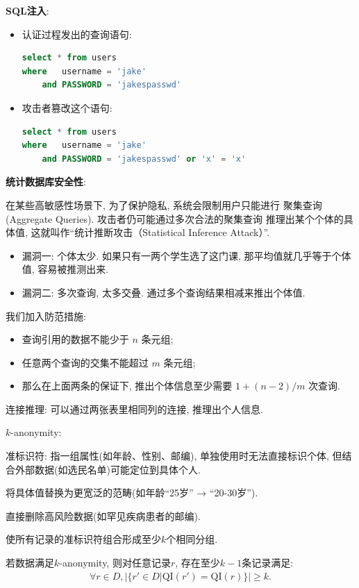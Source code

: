 \textbf{SQL注入}:
\begin{itemize}
    \item 认证过程发出的查询语句:
\begin{lstlisting}[language=SQL]
select * from users
where   username = 'jake'
    and PASSWORD = 'jakespasswd'
\end{lstlisting}
    \item 攻击者篡改这个语句:
\begin{lstlisting}[language=SQL]
select * from users
where   username = 'jake'
    and PASSWORD = 'jakespasswd' or 'x' = 'x'
\end{lstlisting}
\end{itemize}

\textbf{统计数据库安全性}:

在某些高敏感性场景下, 为了保护隐私, 系统会限制用户只能进行 聚集查询(Aggregate Queries).
攻击者仍可能通过多次合法的聚集查询 推理出某个个体的具体值, 这就叫作“统计推断攻击（Statistical Inference Attack）”.
\begin{itemize}
    \item 漏洞一: 个体太少. 如果只有一两个学生选了这门课, 那平均值就几乎等于个体值, 容易被推测出来.
    \item 漏洞二: 多次查询, 太多交叠. 通过多个查询结果相减来推出个体值.
\end{itemize}

我们加入防范措施:
\begin{itemize}
    \item 查询引用的数据不能少于 $n$ 条元组;
    \item 任意两个查询的交集不能超过 $m$ 条元组;
    \item 那么在上面两条的保证下, 推出个体信息至少需要 $1 + (n-2)/m$ 次查询.
\end{itemize}

连接推理: 可以通过两张表里相同列的连接, 推理出个人信息.

$k$-anonymity:
\begin{definition}
    准标识符: 指一组属性(如年龄、性别、邮编), 
    单独使用时无法直接标识个体, 但结合外部数据(如选民名单)可能定位到具体个人.
\end{definition}

\begin{definition}[泛化]
将具体值替换为更宽泛的范畴(如年龄“25岁” → “20-30岁”).
\end{definition}

\begin{definition}[抑制]
    直接删除高风险数据(如罕见疾病患者的邮编).
\end{definition}

使所有记录的准标识符组合形成至少$k$个相同分组.

\begin{definition}[$k$-anonymity]
    若数据满足$k$-anonymity, 则对任意记录$r$, 存在至少$k-1$条记录满足:
    \begin{align*}
        \forall r \in D, |\{r'\in D| \text{QI}(r')=\text{QI}(r)\}| \geq k.
    \end{align*}
\end{definition}
